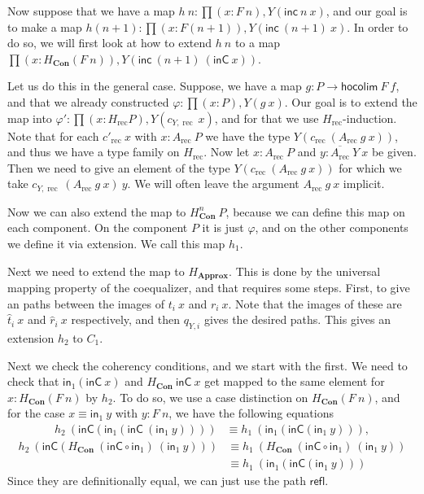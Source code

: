 \documentclass[a4paper,UKenglish]{lipics-v2016}
\newcommand{\Boperator}[1]{\mathsf{#1}}
\newcommand{\inn}{\Boperator{in}}
\newcommand{\rec}[0]{\operatorname{rec}}
\newcommand{\Con}[0]{\textbf{Con}}
\newcommand{\Approx}[0]{\textbf{Approx}}
\newcommand{\refl}[0]{\Boperator{refl}}
\newcommand{\inC}[0]{\Boperator{inC}}
\newcommand{\hocolim}[0]{\Boperator{hocolim}}
\newcommand{\inc}[0]{\Boperator{inc}}
\newcommand{\dak}[1]{\widehat{#1}}
\newcommand{\hatt}{\dak{t}}
\newcommand{\hatr}{\dak{r}}
\begin{document}
Now suppose that we have a map $h \> n : \prod (x : F \> n), Y(\inc \> n \> x)$, and our goal is to make a map $h(n+1) : \prod  (x : F(n+1)), Y(\inc \> (n+1) \> x)$.
In order to do so, we will first look at how to extend $h \> n$ to a map $\prod (x : H_{\Con} (F \> n)), Y(\inc \> (n+1) \> (\inC \> x))$.

Let us do this in the general case.
Suppose, we have a map $g : P \rightarrow \hocolim \> F \> f$, and that we already constructed $\varphi : \prod (x : P), Y(g \> x)$.
Our goal is to extend the map into $\varphi' : \prod (x : H_{\rec} P), Y(c_{Y, \rec} \> x)$, and for that we use $H_{\rec}$-induction.
Note that for each $c'_{\rec} \> x$ with $x : A_{\rec} \> P$ we have the type $Y(c_{\rec} \> (A_{\rec} \> g \> x))$, and thus we have a type family on $H_{\rec}$.
Now let $x : A_{\rec} \> P$ and $y : \overline{A_{\rec}} \> Y \> x$ be given.
Then we need to give an element of the type $Y(c_{\rec} \> (A_{\rec} \> g \> x))$ for which we take $c_{Y,\rec} \> (A_{\rec} \> g \> x) \> y$.
We will often leave the argument $A_{\rec} \> g \> x$ implicit.

Now we can also extend the map to $H_{\Con}^n \> P$, because we can define this map on each component.
On the component $P$ it is just $\varphi$, and on the other components we define it via extension.
We call this map $h_1$.

Next we need to extend the map to $H_{\Approx}$.
This is done by the universal mapping property of the coequalizer, and that requires some steps.
First, to give an paths between the images of $t_i \> x$ and $r_i \> x$.
Note that the images of these are $\hatt_i \> x$ and $\hatr_i \> x$ respectively, and then $q_{Y, i}$ gives the desired paths.
This gives an extension $h_2$ to $C_1$.

Next we check the coherency conditions, and we start with the first.
We need to check that $\inn_1(\inC \> x)$ and $H_{\Con} \> \inC \> x$ get mapped to the same element for $x : H_{\Con}(F \> n)$ by $h_2$.
To do so, we use a case distinction on $H_{\Con}(F \> n)$, and for the case $x \equiv \inn_1 \> y$ with $y : F \> n$, we have the following equations 
\begin{equation*}
\begin{split}
h_2 \> (\inC(\inn_1(\inC \> (\inn_1 \> y))))
&\equiv 
h_1 \> (\inn_1(\inC(\inn_1 \> y))),
\end{split}
\end{equation*}
\begin{equation*}
\begin{split}
h_2 \> (\inC(H_{\Con} \> (\inC \circ \inn_1) \> (\inn_1 \> y)))
&\equiv
h_1 \> (H_{\Con} \> (\inC \circ \inn_1) \> (\inn_1 \> y))\\
&\equiv 
h_1 \> (\inn_1(\inC(\inn_1 \> y)))
\end{split}
\end{equation*}
Since they are definitionally equal, we can just use the path $\refl$.
\end{document}
